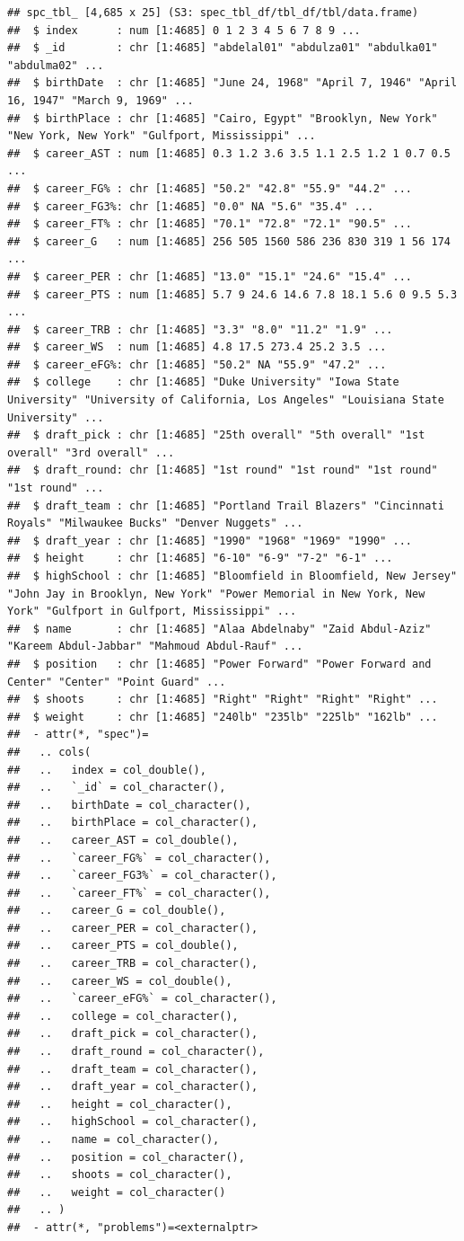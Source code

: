 \documentclass[
]{book}
\begin{document}
\begin{verbatim}
## spc_tbl_ [4,685 x 25] (S3: spec_tbl_df/tbl_df/tbl/data.frame)
##  $ index      : num [1:4685] 0 1 2 3 4 5 6 7 8 9 ...
##  $ _id        : chr [1:4685] "abdelal01" "abdulza01" "abdulka01" "abdulma02" ...
##  $ birthDate  : chr [1:4685] "June 24, 1968" "April 7, 1946" "April 16, 1947" "March 9, 1969" ...
##  $ birthPlace : chr [1:4685] "Cairo, Egypt" "Brooklyn, New York" "New York, New York" "Gulfport, Mississippi" ...
##  $ career_AST : num [1:4685] 0.3 1.2 3.6 3.5 1.1 2.5 1.2 1 0.7 0.5 ...
##  $ career_FG% : chr [1:4685] "50.2" "42.8" "55.9" "44.2" ...
##  $ career_FG3%: chr [1:4685] "0.0" NA "5.6" "35.4" ...
##  $ career_FT% : chr [1:4685] "70.1" "72.8" "72.1" "90.5" ...
##  $ career_G   : num [1:4685] 256 505 1560 586 236 830 319 1 56 174 ...
##  $ career_PER : chr [1:4685] "13.0" "15.1" "24.6" "15.4" ...
##  $ career_PTS : num [1:4685] 5.7 9 24.6 14.6 7.8 18.1 5.6 0 9.5 5.3 ...
##  $ career_TRB : chr [1:4685] "3.3" "8.0" "11.2" "1.9" ...
##  $ career_WS  : num [1:4685] 4.8 17.5 273.4 25.2 3.5 ...
##  $ career_eFG%: chr [1:4685] "50.2" NA "55.9" "47.2" ...
##  $ college    : chr [1:4685] "Duke University" "Iowa State University" "University of California, Los Angeles" "Louisiana State University" ...
##  $ draft_pick : chr [1:4685] "25th overall" "5th overall" "1st overall" "3rd overall" ...
##  $ draft_round: chr [1:4685] "1st round" "1st round" "1st round" "1st round" ...
##  $ draft_team : chr [1:4685] "Portland Trail Blazers" "Cincinnati Royals" "Milwaukee Bucks" "Denver Nuggets" ...
##  $ draft_year : chr [1:4685] "1990" "1968" "1969" "1990" ...
##  $ height     : chr [1:4685] "6-10" "6-9" "7-2" "6-1" ...
##  $ highSchool : chr [1:4685] "Bloomfield in Bloomfield, New Jersey" "John Jay in Brooklyn, New York" "Power Memorial in New York, New York" "Gulfport in Gulfport, Mississippi" ...
##  $ name       : chr [1:4685] "Alaa Abdelnaby" "Zaid Abdul-Aziz" "Kareem Abdul-Jabbar" "Mahmoud Abdul-Rauf" ...
##  $ position   : chr [1:4685] "Power Forward" "Power Forward and Center" "Center" "Point Guard" ...
##  $ shoots     : chr [1:4685] "Right" "Right" "Right" "Right" ...
##  $ weight     : chr [1:4685] "240lb" "235lb" "225lb" "162lb" ...
##  - attr(*, "spec")=
##   .. cols(
##   ..   index = col_double(),
##   ..   `_id` = col_character(),
##   ..   birthDate = col_character(),
##   ..   birthPlace = col_character(),
##   ..   career_AST = col_double(),
##   ..   `career_FG%` = col_character(),
##   ..   `career_FG3%` = col_character(),
##   ..   `career_FT%` = col_character(),
##   ..   career_G = col_double(),
##   ..   career_PER = col_character(),
##   ..   career_PTS = col_double(),
##   ..   career_TRB = col_character(),
##   ..   career_WS = col_double(),
##   ..   `career_eFG%` = col_character(),
##   ..   college = col_character(),
##   ..   draft_pick = col_character(),
##   ..   draft_round = col_character(),
##   ..   draft_team = col_character(),
##   ..   draft_year = col_character(),
##   ..   height = col_character(),
##   ..   highSchool = col_character(),
##   ..   name = col_character(),
##   ..   position = col_character(),
##   ..   shoots = col_character(),
##   ..   weight = col_character()
##   .. )
##  - attr(*, "problems")=<externalptr>
\end{verbatim}
\end{document}
